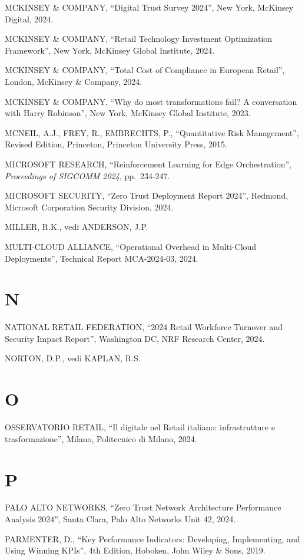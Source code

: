 \documentclass[12pt,a4paper,oneside]{book}
\numberwithin{figure}{chapter} %
\numberwithin{table}{chapter}  %
\begin{document}
MCKINSEY \& COMPANY, ``Digital Trust Survey 2024'', New York, McKinsey
Digital, 2024.

MCKINSEY \& COMPANY, ``Retail Technology Investment Optimization
Framework'', New York, McKinsey Global Institute, 2024.

MCKINSEY \& COMPANY, ``Total Cost of Compliance in European Retail'',
London, McKinsey \& Company, 2024.

MCKINSEY \& COMPANY, ``Why do most transformations fail? A conversation
with Harry Robinson'', New York, McKinsey Global Institute, 2023.

MCNEIL, A.J., FREY, R., EMBRECHTS, P., ``Quantitative Risk Management'',
Revised Edition, Princeton, Princeton University Press, 2015.

MICROSOFT RESEARCH, ``Reinforcement Learning for Edge Orchestration'',
\emph{Proceedings of SIGCOMM 2024}, pp.~234-247.

MICROSOFT SECURITY, ``Zero Trust Deployment Report 2024'', Redmond,
Microsoft Corporation Security Division, 2024.

MILLER, R.K., vedi ANDERSON, J.P.

MULTI-CLOUD ALLIANCE, ``Operational Overhead in Multi-Cloud
Deployments'', Technical Report MCA-2024-03, 2024.

\section{N}\label{n-1}

NATIONAL RETAIL FEDERATION, ``2024 Retail Workforce Turnover and
Security Impact Report'', Washington DC, NRF Research Center, 2024.

NORTON, D.P., vedi KAPLAN, R.S.

\section{O}\label{o-1}

OSSERVATORIO RETAIL, ``Il digitale nel Retail italiano: infrastrutture e
trasformazione'', Milano, Politecnico di Milano, 2024.

\section{P}\label{p-1}

PALO ALTO NETWORKS, ``Zero Trust Network Architecture Performance
Analysis 2024'', Santa Clara, Palo Alto Networks Unit 42, 2024.

PARMENTER, D., ``Key Performance Indicators: Developing, Implementing,
and Using Winning KPIs'', 4th Edition, Hoboken, John Wiley \& Sons,
2019.
\end{document}
